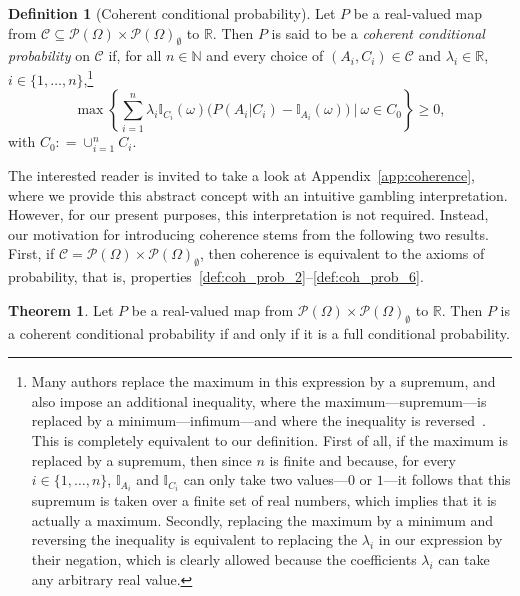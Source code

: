 \documentclass[10pt,a4paper]{paper}
\theoremstyle{definition}
\newtheorem{theorem}{Theorem}[section]
\newtheorem{definition}{Definition}
\newcommand{\reals}{\mathbb{R}}
\newcommand{\paths}{\Omega}
\newcommand{\power}{\mathcal{P}(\paths)}
\newcommand{\nonemptypower}{\power_{\emptyset}}
\newcommand{\ind}[1]{\mathbb{I}_{#1}}
\newcommand{\coloneqq}{:\!=}
\begin{document}

\begin{definition}[Coherent conditional probability]\label{def:coherence}
Let $P$ be a real-valued map from $\mathcal{C}\subseteq\power\times\nonemptypower$ to $\reals$. Then $P$ is said to be a \emph{coherent conditional probability} on $\mathcal{C}$ if, for all $n\in\mathbb{N}$ and every choice of $(A_i,C_i)\in\mathcal{C}$ and $\lambda_i\in\reals$, $i\in\{1,\dots,n\}$,\footnote{Many authors replace the maximum in this expression by a supremum, and also impose an additional inequality, where the maximum---supremum---is replaced by a minimum---infimum---and where the inequality is reversed~\cite{berti2002coherent,berti1991coherent,regazzini1985finitely}. This is completely equivalent to our definition. First of all, if the maximum is replaced by a supremum, then since $n$ is finite and because, for every $i\in\{1,\dots,n\}$, $\ind{A_i}$ and $\ind{C_i}$ can only take two values---$0$ or $1$---it follows that this supremum is taken over a finite set of real numbers, which implies that it is actually a maximum. Secondly, replacing the maximum by a minimum and reversing the inequality is equivalent to replacing the $\lambda_i$ in our expression by their negation, which is clearly allowed because the coefficients $\lambda_i$ can take any arbitrary real value.}
\begin{equation*}
\max\left\{\sum_{i=1}^n\lambda_i\ind{C_i}(\omega)\bigl(P(A_i\vert C_i)-\ind{A_i}(\omega)\bigr)~\Bigg\vert~\omega\in C_0\right\}\geq0,
\end{equation*}
with $C_0\coloneqq\cup_{i=1}^nC_i$.
\end{definition}

The interested reader is invited to take a look at Appendix~\ref{app:coherence}, where we provide this abstract concept with an intuitive gambling interpretation. However, for our present purposes, this interpretation is not required. Instead, our motivation for introducing coherence stems from the following two results. First, if $\mathcal{C}=\power\times\nonemptypower$, then coherence is equivalent to the axioms of probability, that is, properties~\ref{def:coh_prob_2}--\ref{def:coh_prob_6}.%
\begin{theorem}{\cite[Theorem 3]{regazzini1985finitely}}\label{theo:fullcoherent}
Let $P$ be a real-valued map from $\power\times\nonemptypower$ to $\reals$. Then $P$ is a coherent conditional probability if and only if it is a full conditional probability.
\end{theorem}
\end{document}
